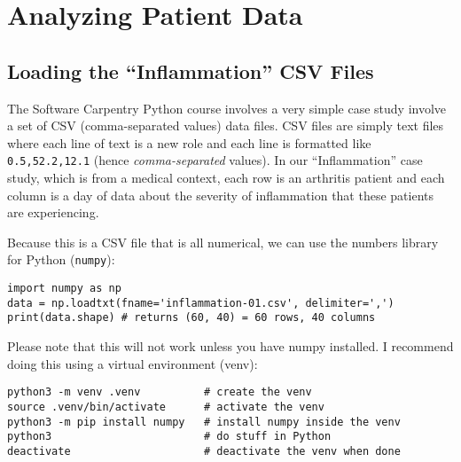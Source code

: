 \section{Analyzing Patient Data}
\begin{multicols*}{2}
\subsection{Loading the ``Inflammation'' CSV Files}
\par
The Software Carpentry Python course involves a very simple case study involve a set of CSV (comma-separated values) data files. CSV files are simply text files where each line of text is a new role and each line is formatted like \texttt{0.5,52.2,12.1} (hence \textit{comma-separated} values). In our ``Inflammation'' case study, which is from a medical context, each row is an arthritis patient and each column is a day of data about the severity of inflammation that these patients are experiencing.
\par
Because this is a CSV file that is all numerical, we can use the numbers library for Python (\texttt{numpy}):

\vspace{-4mm}
\begin{verbatim}
import numpy as np
data = np.loadtxt(fname='inflammation-01.csv', delimiter=',')
print(data.shape) # returns (60, 40) = 60 rows, 40 columns
\end{verbatim}

\par
Please note that this will not work unless you have numpy installed. I recommend doing this using a virtual environment (venv):

\vspace{-4mm}
\begin{verbatim}
python3 -m venv .venv          # create the venv
source .venv/bin/activate      # activate the venv
python3 -m pip install numpy   # install numpy inside the venv
python3                        # do stuff in Python
deactivate                     # deactivate the venv when done
\end{verbatim}


\end{multicols*}
